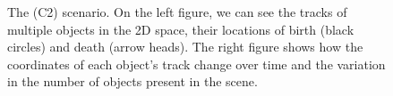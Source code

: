 \begin{figure}
\begin{subfigure}[]{0.48\linewidth}
\begin{subfigure}[b]{\linewidth}
        \end{subfigure}
    \end{subfigure}
  \caption[True tracks of objects in the (C2) scenario.]{The (C2) scenario. On the left figure, we can see the tracks of multiple objects in the 2D space, their locations of birth (black circles) and death (arrow heads). The right figure shows how the coordinates of each object's track change over time and the variation in the number of objects present in the scene.}
  \label{fig:c2-scenario}
\end{figure}
